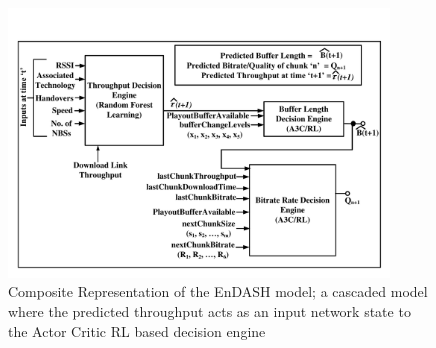  \begin{figure}[t]
	\centering
	\includegraphics[width = 0.9\textwidth,trim = {1cm 1cm 1cm 1cm}]{figures/EnDASH_system.pdf}
	\caption{Composite Representation of the EnDASH model; a cascaded model where the predicted throughput acts as an input network state to the Actor Critic \ac{RL} based decision engine}
	\label{fig:EnDASH system}
\end{figure}

